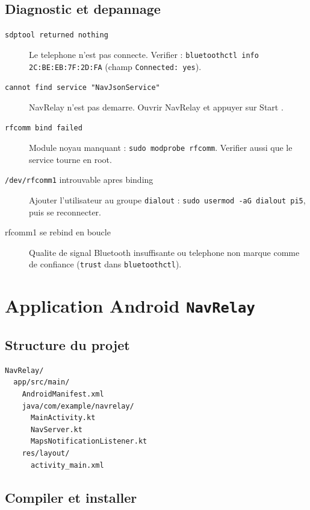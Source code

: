 \documentclass[a4paper,11pt]{article}
\begin{document}
\subsection{Diagnostic et depannage}

\begin{description}
  \item[\texttt{sdptool returned nothing}]
    Le telephone n'est pas connecte. Verifier :
    \texttt{bluetoothctl info 2C:BE:EB:7F:2D:FA} (champ \texttt{Connected: yes}).
  \item[\texttt{cannot find service "NavJsonService"}]
    NavRelay n'est pas demarre. Ouvrir NavRelay et appuyer sur \og Start \fg{}.
  \item[\texttt{rfcomm bind failed}]
    Module noyau manquant : \texttt{sudo modprobe rfcomm}.
    Verifier aussi que le service tourne en root.
  \item[\texttt{/dev/rfcomm1} introuvable apres binding]
    Ajouter l'utilisateur au groupe \texttt{dialout} :
    \texttt{sudo usermod -aG dialout pi5}, puis se reconnecter.
  \item[rfcomm1 se rebind en boucle]
    Qualite de signal Bluetooth insuffisante ou telephone non marque comme
    de confiance (\texttt{trust} dans \texttt{bluetoothctl}).
\end{description}

\section{Application Android \texttt{NavRelay}}

\subsection{Structure du projet}

\begin{verbatim}
NavRelay/
  app/src/main/
    AndroidManifest.xml
    java/com/example/navrelay/
      MainActivity.kt
      NavServer.kt
      MapsNotificationListener.kt
    res/layout/
      activity_main.xml
\end{verbatim}

\subsection{Compiler et installer}
\end{document}

